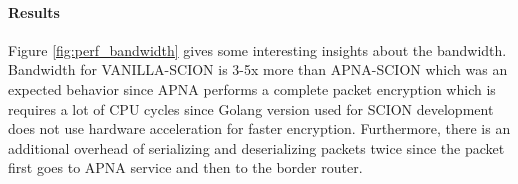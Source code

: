 \paragraph{Results}
Figure \ref{fig:perf_bandwidth} gives some interesting insights about the bandwidth. Bandwidth for VANILLA-SCION is 3-5x more than APNA-SCION which was an expected behavior since APNA performs a complete packet encryption which is requires a lot of CPU cycles since Golang version used for SCION development does not use hardware acceleration for faster encryption. Furthermore, there is an additional overhead of serializing and deserializing packets twice since the packet first goes to APNA service and then to the border router.
